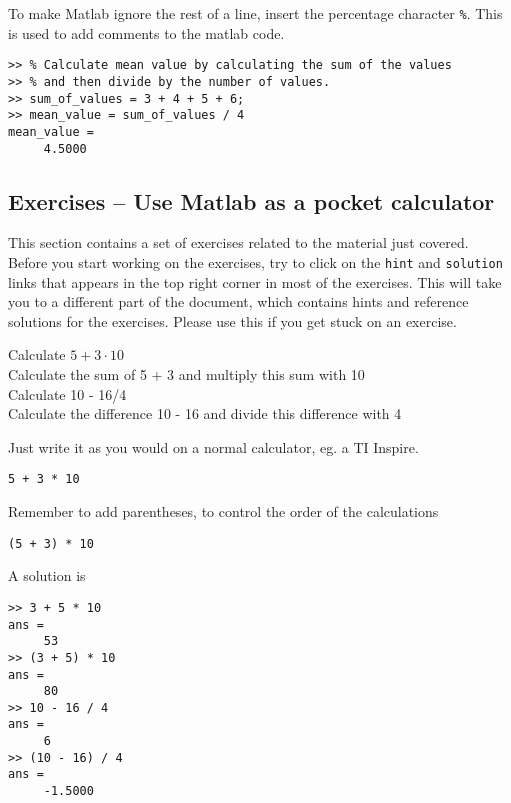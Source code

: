To make Matlab ignore the rest of a line, insert the percentage 
character \verb!%!. 
This is used to add comments to the matlab code.
\begin{lstlisting}
>> % Calculate mean value by calculating the sum of the values 
>> % and then divide by the number of values.
>> sum_of_values = 3 + 4 + 5 + 6;
>> mean_value = sum_of_values / 4
mean_value =
     4.5000
\end{lstlisting}


\subsection{Exercises -- Use Matlab as a pocket calculator}

This section contains a set of exercises related to the material 
just covered.
Before you start working on the exercises, try to click on the 
\verb!hint! and \verb!solution! links that appears in the top 
right corner in most of the exercises.
This will take you to a different part of the document, which contains 
hints and reference solutions for the exercises.
Please use this if you get stuck on an exercise.

\begin{ex}
Calculate $5 + 3 \cdot 10$\\
Calculate the sum of 5 + 3 and multiply this sum with 10\\
Calculate 10 - 16/4\\
Calculate the difference 10 - 16 and divide this difference with 4
\begin{hint}
Just write it as you would on a normal calculator, eg. a TI Inspire.
\begin{lstlisting}
5 + 3 * 10
\end{lstlisting}
\end{hint}
\begin{secondhint}
Remember to add parentheses, to control the order of the calculations
\begin{lstlisting}
(5 + 3) * 10
\end{lstlisting}
\end{secondhint}
\begin{sol}
A solution is
\begin{lstlisting}
>> 3 + 5 * 10
ans = 
     53
>> (3 + 5) * 10
ans = 
     80
>> 10 - 16 / 4
ans = 
     6
>> (10 - 16) / 4
ans = 
     -1.5000
\end{lstlisting}
\end{sol}
\end{ex}
\known{+, -, *, /}


